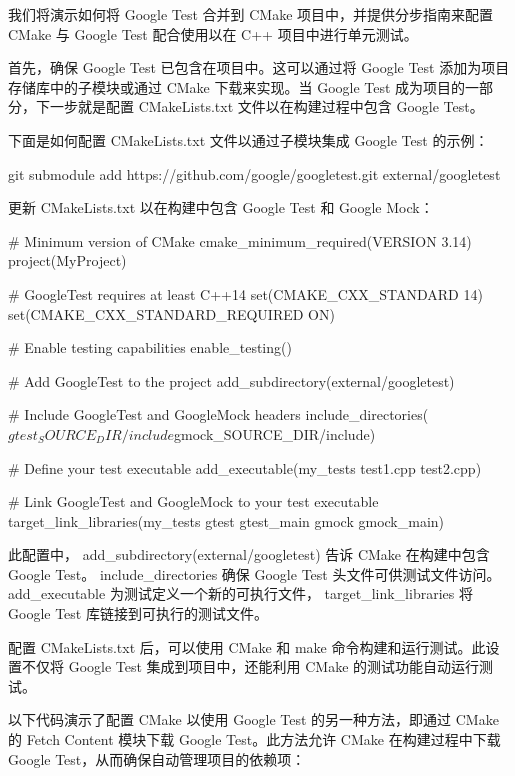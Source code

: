 我们将演示如何将 Google Test 合并到 CMake 项目中，并提供分步指南来配置 CMake 与 Google Test 配合使用以在 C++ 项目中进行单元测试。

首先，确保 Google Test 已包含在项目中。这可以通过将 Google Test 添加为项目存储库中的子模块或通过 CMake 下载来实现。当 Google Test 成为项目的一部分，下一步就是配置 CMakeLists.txt 文件以在构建过程中包含 Google Test。

下面是如何配置 CMakeLists.txt 文件以通过子模块集成 Google Test 的示例：

\begin{shell}
git submodule add https://github.com/google/googletest.git external/googletest
\end{shell}

更新 CMakeLists.txt 以在构建中包含 Google Test 和 Google Mock：

\begin{cmake}
# Minimum version of CMake
cmake_minimum_required(VERSION 3.14)
project(MyProject)

# GoogleTest requires at least C++14
set(CMAKE_CXX_STANDARD 14)
set(CMAKE_CXX_STANDARD_REQUIRED ON)

# Enable testing capabilities
enable_testing()

# Add GoogleTest to the project
add_subdirectory(external/googletest)

# Include GoogleTest and GoogleMock headers
include_directories(${gtest_SOURCE_DIR}/include ${gmock_SOURCE_DIR}/include)

# Define your test executable
add_executable(my_tests test1.cpp test2.cpp)

# Link GoogleTest and GoogleMock to your test executable
target_link_libraries(my_tests gtest gtest_main gmock gmock_main)
\end{cmake}

此配置中， add\_subdirectory(external/googletest) 告诉 CMake 在构建中包含 Google Test。 include\_directories 确保 Google Test 头文件可供测试文件访问。 add\_executable 为测试定义一个新的可执行文件， target\_link\_libraries 将 Google Test 库链接到可执行的测试文件。

配置 CMakeLists.txt 后，可以使用 CMake 和 make 命令构建和运行测试。此设置不仅将 Google Test 集成到项目中，还能利用 CMake 的测试功能自动运行测试。

以下代码演示了配置 CMake 以使用 Google Test 的另一种方法，即通过 CMake 的 Fetch Content 模块下载 Google Test。此方法允许 CMake 在构建过程中下载 Google Test，从而确保自动管理项目的依赖项：


